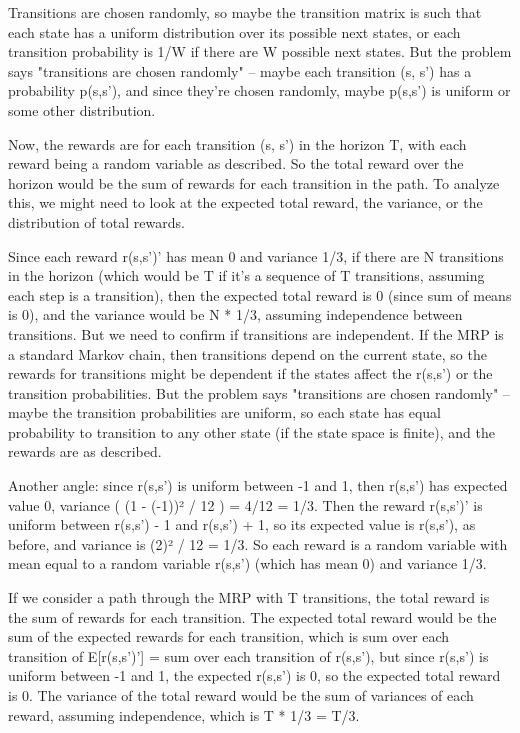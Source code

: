 Transitions are chosen randomly, so maybe the transition matrix is such that each state has a uniform distribution over its possible next states, or each transition probability is 1/W if there are W possible next states. But the problem says "transitions are chosen randomly" – maybe each transition (s, s') has a probability p(s,s'), and since they're chosen randomly, maybe p(s,s') is uniform or some other distribution.

Now, the rewards are for each transition (s, s') in the horizon T, with each reward being a random variable as described. So the total reward over the horizon would be the sum of rewards for each transition in the path. To analyze this, we might need to look at the expected total reward, the variance, or the distribution of total rewards.

Since each reward r(s,s')' has mean 0 and variance 1/3, if there are N transitions in the horizon (which would be T if it's a sequence of T transitions, assuming each step is a transition), then the expected total reward is 0 (since sum of means is 0), and the variance would be N * 1/3, assuming independence between transitions. But we need to confirm if transitions are independent. If the MRP is a standard Markov chain, then transitions depend on the current state, so the rewards for transitions might be dependent if the states affect the r(s,s') or the transition probabilities. But the problem says "transitions are chosen randomly" – maybe the transition probabilities are uniform, so each state has equal probability to transition to any other state (if the state space is finite), and the rewards are as described.

Another angle: since r(s,s') is uniform between -1 and 1, then r(s,s') has expected value 0, variance ( (1 - (-1))² / 12 ) = 4/12 = 1/3. Then the reward r(s,s')' is uniform between r(s,s') - 1 and r(s,s') + 1, so its expected value is r(s,s'), as before, and variance is (2)² / 12 = 1/3. So each reward is a random variable with mean equal to a random variable r(s,s') (which has mean 0) and variance 1/3.

If we consider a path through the MRP with T transitions, the total reward is the sum of rewards for each transition. The expected total reward would be the sum of the expected rewards for each transition, which is sum over each transition of E[r(s,s')'] = sum over each transition of r(s,s'), but since r(s,s') is uniform between -1 and 1, the expected r(s,s') is 0, so the expected total reward is 0. The variance of the total reward would be the sum of variances of each reward, assuming independence, which is T * 1/3 = T/3.

